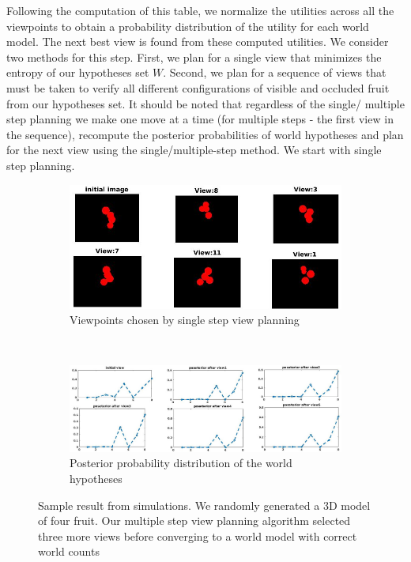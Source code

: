 Following the computation of this table, we normalize the utilities across all the viewpoints to obtain a probability distribution of the utility for each world model. The next best view is found from these computed utilities. We consider two methods for this step. First, we plan for a single view that minimizes the entropy of our hypotheses set $W$. Second, we plan for a sequence of views that must be taken to verify all different configurations of visible and occluded fruit from our hypotheses set. It should be noted that regardless of the single/ multiple step planning we make one move at a time (for multiple steps - the first view in the sequence), recompute the posterior probabilities of world hypotheses and plan for the next view using the single/multiple-step method. We start with single step planning.

\begin{figure}[htb]
\centering
\begin{subfigure}[t]{\textwidth}
    \includegraphics[width=\textwidth]{figures/active_counting/viewsgd}
\caption{Viewpoints chosen by single step view planning}
\label{fig:simviews}
\end{subfigure}\\
\begin{subfigure}[t]{\textwidth}
    \includegraphics[width=\textwidth]{figures/active_counting/posterior1}
\caption{Posterior probability distribution of the world hypotheses}
\label{fig:simpost}
\end{subfigure}
\caption[Simulation results for single step planning.]{Sample result from simulations. We randomly generated a 3D model of four fruit. Our  multiple step view planning algorithm selected three more views before converging to a world model with correct world counts }
\label{fig:simsamp}
\end{figure}

